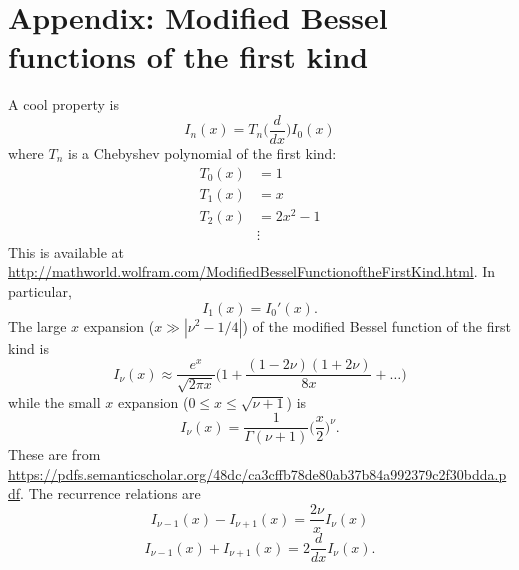 \documentclass[11pt]{article}
\newcommand\be{\begin{equation}} %
\newcommand\ee{\end{equation}}   %
\begin{document}
\section*{Appendix: Modified Bessel functions of the first kind}
A cool property is 
\be I_n(x) = T_n\Big(\frac{d}{dx}\Big)I_0(x)\ee
where $T_n$ is a Chebyshev polynomial of the first kind:
\begin{align}
T_0(x) &= 1 \\
T_1(x) &= x \\
T_2(x) &= 2x^2 -1 \\
&\vdots
\end{align}
This is available at \url{http://mathworld.wolfram.com/ModifiedBesselFunctionoftheFirstKind.html}.
In particular, 
\be I_1(x) = I_0'(x).\ee
The large $x$ expansion ($x\gg | \nu^2-1/4|$) of the modified Bessel function of the first kind is 
\be I_\nu(x) \approx \frac{e^x}{\sqrt{2\pi x}}\Big(1 + \frac{(1-2\nu)(1+2\nu)}{8x} + \dots \Big)\ee
while the small $x$ expansion ($0\leq x \leq \sqrt{\nu+1}$) is
\be I_\nu(x) = \frac{1}{\Gamma(\nu+ 1)}\Big(\frac{x}{2}\Big)^\nu.\ee
These are from \url{https://pdfs.semanticscholar.org/48dc/ca3cffb78de80ab37b84a992379c2f30bdda.pdf}.
The recurrence relations are
\be I_{\nu-1}(x) - I_{\nu+1}(x) = \frac{2\nu}{x}I_\nu(x)\ee
\be I_{\nu-1}(x) + I_{\nu+1}(x) = 2\frac{d}{dx}I_\nu(x).\ee

\end{document}
